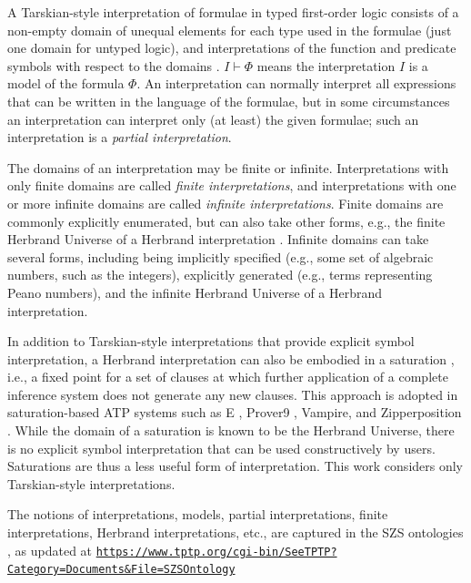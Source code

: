 \documentclass{easychair}
\newcommand{\smalltt}[1]{\small \texttt{#1}}
\begin{document}
A Tarskian-style interpretation \cite{TV56} of formulae in typed first-order logic consists of a 
non-empty domain of unequal elements for each type used in the formulae (just one domain for 
untyped logic), and interpretations of the function and predicate symbols with respect to the 
domains \cite{Hun96,Gal15}.
$I \vdash \Phi$ means the interpretation $I$ is a model of the formula $\Phi$.
An interpretation can normally interpret all expressions that can be written in the language of 
the formulae, but in some circumstances an interpretation can interpret only (at least) the given 
formulae; such an interpretation is a {\em partial interpretation}.

The domains of an interpretation may be finite or infinite.
Interpretations with only finite domains are called {\em finite interpretations}, and
interpretations with one or more infinite domains are called {\em infinite interpretations}.
Finite domains are commonly explicitly enumerated, but can also take other forms, e.g., the 
finite Herbrand Universe of a Herbrand interpretation \cite{Her30}.
Infinite domains can take several forms, including being implicitly specified (e.g., some set
of algebraic numbers, such as the integers), explicitly generated (e.g., terms representing 
Peano numbers), and the infinite Herbrand Universe of a Herbrand interpretation.

In addition to Tarskian-style interpretations that provide explicit symbol interpretation, 
a Herbrand interpretation can also be embodied in a saturation \cite{BG+01},
i.e., a fixed point for a set of clauses at which further application of a complete inference 
system does not generate any new clauses.
This approach is adopted in saturation-based ATP systems such as E \cite{SCV19},
Prover9 \cite{McC-Prover9-URL}, Vampire, and Zipperposition \cite{VB+21}.
While the domain of a saturation is known to be the Herbrand Universe, there is no explicit
symbol interpretation that can be used constructively by users.
Saturations are thus a less useful form of interpretation.
This work considers only Tarskian-style interpretations.

The notions of interpretations, models, partial interpretations, finite interpretations,
Herbrand interpretations, etc., are captured in the SZS ontologies \cite{Sut08-KEAPPA}, as
updated at 
{\smalltt{\url{https://www.tptp.org/cgi-bin/SeeTPTP?Category=Documents&File=SZSOntology}}}

\end{document}
